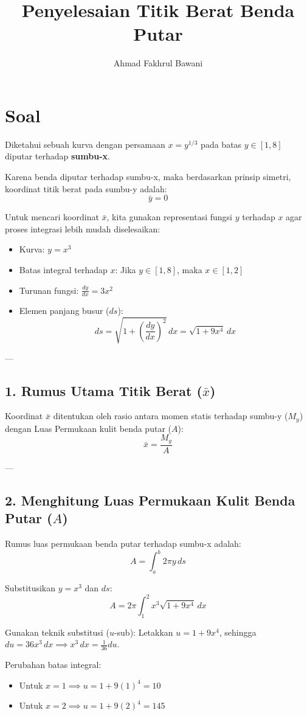 \documentclass[12pt,a4paper]{article}
\title{Penyelesaian Titik Berat Benda Putar}
\author{Ahmad Fakhrul Bawani}
\date{}
\begin{document}
\maketitle

\section*{Soal}
Diketahui sebuah kurva dengan persamaan $x = y^{1/3}$ pada batas $y \in [1, 8]$ diputar terhadap \textbf{sumbu-x}. 

Karena benda diputar terhadap sumbu-x, maka berdasarkan prinsip simetri, koordinat titik berat pada sumbu-y adalah:
\[\bar{y} = 0\]

Untuk mencari koordinat $\bar{x}$, kita gunakan representasi fungsi $y$ terhadap $x$ agar proses integrasi lebih mudah diselesaikan:
\begin{itemize}
  \item Kurva: $y = x^3$
  \item Batas integral terhadap $x$: Jika $y \in [1, 8]$, maka $x \in [1, 2]$
  \item Turunan fungsi: $\frac{dy}{dx} = 3x^2$
  \item Elemen panjang busur ($ds$): 
  \[ds = \sqrt{1 + \left(\frac{dy}{dx}\right)^2} \, dx = \sqrt{1 + 9x^4} \, dx\]
\end{itemize}

---

\subsection*{1. Rumus Utama Titik Berat ($\bar{x}$)}
Koordinat $\bar{x}$ ditentukan oleh rasio antara momen statis terhadap sumbu-y ($M_y$) dengan Luas Permukaan kulit benda putar ($A$):
\[\bar{x} = \frac{M_y}{A}\]

---

\subsection*{2. Menghitung Luas Permukaan Kulit Benda Putar ($A$)}
Rumus luas permukaan benda putar terhadap sumbu-x adalah:
\[A = \int_{a}^{b} 2\pi y \, ds\]

Substitusikan $y = x^3$ dan $ds$:
\[A = 2\pi \int_{1}^{2} x^3 \sqrt{1 + 9x^4} \, dx\]

Gunakan teknik substitusi ($u$-sub):
Letakkan $u = 1 + 9x^4$, sehingga $du = 36x^3 \, dx \implies x^3 \, dx = \frac{1}{36} du$.

Perubahan batas integral:
\begin{itemize}
  \item Untuk $x = 1 \implies u = 1 + 9(1)^4 = 10$
  \item Untuk $x = 2 \implies u = 1 + 9(2)^4 = 145$
\end{itemize}
\end{document}
